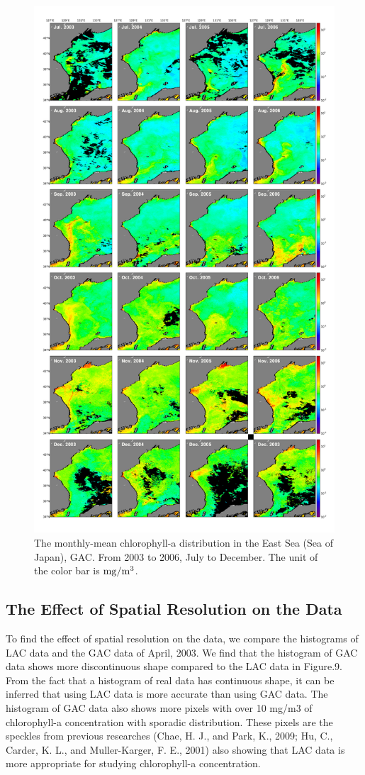 \begin{figure}
	\centering
	\includegraphics[width=0.8\linewidth]{../images/noname04}
	\caption{The monthly-mean chlorophyll-a distribution in the East Sea (Sea of Japan), GAC. From 2003 to 2006, July to December. The unit of the color bar is $\rm mg/m^3$.}
	\label{fig:noname04}
\end{figure}
 
\subsection{The Effect of Spatial Resolution on the Data}
 
To find the effect of spatial resolution on the data, we compare the histograms of LAC data and the GAC data of April, 2003. We find that the histogram of GAC data shows more discontinuous shape compared to the LAC data in Figure.9. From the fact that a histogram of real data has continuous shape, it can be inferred that using LAC data is more accurate than using GAC data. The histogram of GAC data also shows more pixels with over 10 mg/m3 of chlorophyll-a concentration with sporadic distribution. These pixels are the speckles from previous researches (Chae, H. J., and Park, K., 2009; Hu, C., Carder, K. L., and Muller-Karger, F. E., 2001) also showing that LAC data is more appropriate for studying chlorophyll-a concentration.
  
